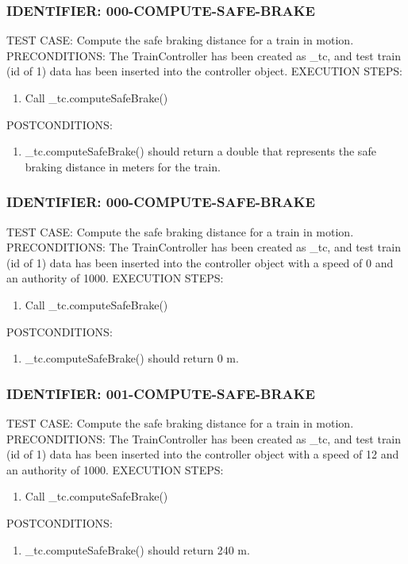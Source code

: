\documentclass{scrreprt}
\begin{document}
\subsubsection{IDENTIFIER: 000-COMPUTE-SAFE-BRAKE}
TEST CASE: Compute the safe braking distance for a train in motion.
PRECONDITIONS: The TrainController has been created as _tc, and test train (id of 1) data has been inserted into the controller object.
EXECUTION STEPS:
\begin{enumerate}
	\item Call _tc.computeSafeBrake()
\end{enumerate}
POSTCONDITIONS:
\begin{enumerate}
	\item _tc.computeSafeBrake() should return a double that represents the safe braking distance in meters for the train.
\end{enumerate}

\subsubsection{IDENTIFIER: 000-COMPUTE-SAFE-BRAKE}
TEST CASE: Compute the safe braking distance for a train in motion.
PRECONDITIONS: The TrainController has been created as _tc, and test train (id of 1) data has been inserted into the controller object with a speed of 0 and an authority of 1000.
EXECUTION STEPS:
\begin{enumerate}
	\item Call _tc.computeSafeBrake()
\end{enumerate}
POSTCONDITIONS:
\begin{enumerate}
	\item _tc.computeSafeBrake() should return 0 m.
\end{enumerate}

\subsubsection{IDENTIFIER: 001-COMPUTE-SAFE-BRAKE}
TEST CASE: Compute the safe braking distance for a train in motion.
PRECONDITIONS: The TrainController has been created as _tc, and test train (id of 1) data has been inserted into the controller object with a speed of 12 and an authority of 1000.
EXECUTION STEPS:
\begin{enumerate}
	\item Call _tc.computeSafeBrake()
\end{enumerate}
POSTCONDITIONS:
\begin{enumerate}
	\item _tc.computeSafeBrake() should return 240 m.
\end{enumerate}
\end{document}
